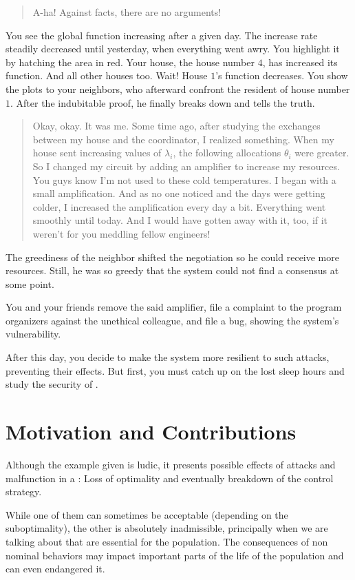 \documentclass[../main.tex]{subfiles}
\begin{document}
\begin{quote}
  A-ha! Against facts, there are no arguments!
\end{quote}
You see the global function increasing after a given day. The increase rate steadily decreased until yesterday, when everything went awry.
You highlight it by hatching the area in red.
Your house, the house number $4$, has increased its function. And all other houses too. Wait! House $1$'s function decreases.
You show the plots to your neighbors, who afterward confront the resident of house number $1$.
After the indubitable proof, he finally breaks down and tells the truth.
\begin{quote}
  \raggedright
  Okay, okay. It was me. Some time ago, after studying the exchanges between my house and the coordinator, I realized something.
When my house sent increasing values of $\lambda_{i}$, the following allocations $\theta_{i}$ were greater.
  So I changed my circuit by adding an amplifier to increase my resources.
  You guys know I'm not used to these cold temperatures.
  I began with a small amplification.
And as no one noticed and the days were getting colder, I increased the amplification every day a bit.
  Everything went smoothly until today.
  And I would have gotten away with it, too, if it weren't for you meddling fellow engineers!
\end{quote}
The greediness of the neighbor shifted the negotiation so he could receive more resources.
Still, he was so greedy that the system could not find a consensus at some point.

You and your friends remove the said amplifier, file a complaint to the program organizers against the unethical colleague, and file a bug, showing the system's vulnerability.

After this day, you decide to make the system more resilient to such attacks, preventing their effects.
But first, you must catch up on the lost sleep hours and study the security of \cps{}.

\section{Motivation and Contributions}
Although the example given is ludic, it presents possible effects of attacks and malfunction in a \cps{}: Loss of optimality and eventually breakdown of the control strategy.

While one of them can sometimes be acceptable (depending on the suboptimality), the other is absolutely inadmissible, principally when we are talking about \cps{} that are essential for the population.
The consequences of non nominal behaviors may impact important parts of the life of the population and can even endangered it.
\end{document}
